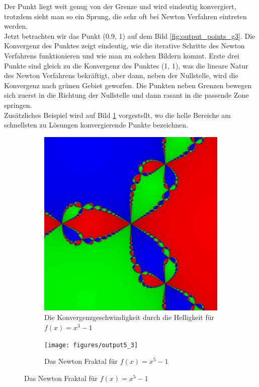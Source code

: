 \documentclass[a4paper,12pt]{llncs}
\numberwithin{equation}{section}
\begin{document}
Der Punkt liegt weit genug von der Grenze und wird eindeutig konvergiert, trotzdem sieht man so ein Sprung, die sehr oft bei Newton Verfahren eintreten werden.\\
Jetzt betrachten wir das Punkt (0.9, 1) auf dem Bild \ref{fig:output_points_g3}.
Die Konvergenz des Punktes zeigt eindeutig, wie die iterative Schritte des Newton Verfahrens funktionieren und wie man zu solchen Bildern kommt. 
Erste drei Punkte sind gleich zu die Konvergenz des Punktes (1, 1), was die lineare Natur des Newton Verfahrens bekräftigt, aber dann, neben der Nullstelle, wird die Konvergenz nach grünen Gebiet geworfen.
Die Punkten neben Grenzen bewegen sich zuerst in die Richtung der Nullstelle und dann rasant in die passende Zone springen.\\
Zusätzliches Beispiel wird auf Bild \ref{fig:output3_3} vorgestellt, wo die helle Bereiche am schnellsten zu Lösungen konvergierende Punkte bezeichnen.
\begin{figure}[ht]   
	\begin{subfigure}{.5\textwidth}
	\centering
		\includegraphics[width=.7\linewidth]{figures/output3_3}
		\captionsetup{width=0.8\textwidth}
		\caption{Die Konvergenzgeschwindigkeit durch die Helligkeit für $f(x)=x^3-1$ }
		\label{fig:output3_3}
	\end{subfigure}%
	\begin{subfigure}{.5\textwidth}
	\centering
		\texttt{[image: figures/output5\_3]}
		\captionsetup{width=0.8\textwidth}
		\caption{Das Newton Fraktal für $f(x)=x^5-1$ }
		\label{fig:output5_3}
	\end{subfigure}%
\end{figure}
\end{document}
